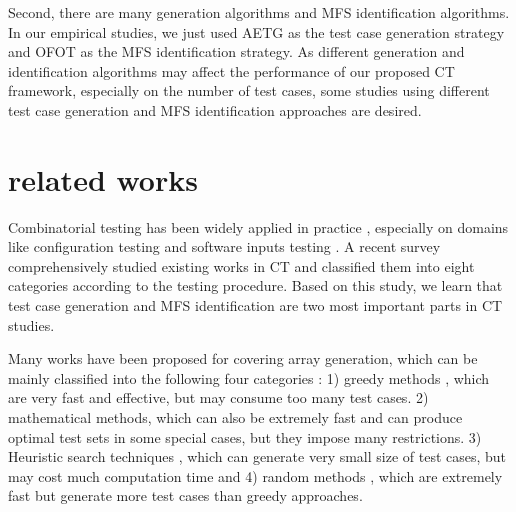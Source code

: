 \documentclass[journal,12pt,onecolumn,draftclsnofoot,]{IEEEtran}
\begin{document}
Second, there are many generation algorithms and MFS identification algorithms. In our empirical studies, we just used AETG \cite{cohen1997aetg} as the test case generation strategy and OFOT \cite{nie2011minimal} as the MFS identification strategy. As different generation and identification algorithms may affect the performance of our proposed CT framework, especially on the number of test cases, some studies using different test case generation and MFS identification approaches are desired.




\section{related works}\label{sec:related}
Combinatorial testing has been widely applied in practice \cite{kuhn2010practical}, especially on domains like configuration testing \cite{yilmaz2006covering,cohen2006testing,fouche2009incremental} and software inputs testing \cite{cohen1997aetg,borazjany2012combinatorial,garn2014eris}. A recent survey \cite{nie2011survey} comprehensively studied existing works in CT and classified them into eight categories according to the testing procedure. Based on this study, we learn that test case generation and MFS identification are two most important parts in CT studies.

Many works have been proposed for covering array generation, which can be mainly classified into the following four categories \cite{nie2011survey}: 1) greedy methods \cite{cohen1997aetg,lei2008ipog,bryce2005framework,bryce2007density}, which are very fast and effective, but may consume too many test cases.  2) mathematical methods\cite{hartman2005software,kobayashi2002design,williams2000determination,williams2002formulation}, which can also be extremely fast and can produce optimal test sets in some special cases, but they impose many restrictions. 3) Heuristic search techniques \cite{bryce2007one,cohen2003augmenting,cohen2003constructing,ghazi2003pair,shiba2004using,wu2015discrete}, which can generate very small size of test cases, but may cost much computation time and 4) random methods \cite{schroeder2004comparing,nie2015combinatorial}, which are extremely fast but generate more test cases than greedy approaches.
\end{document}

